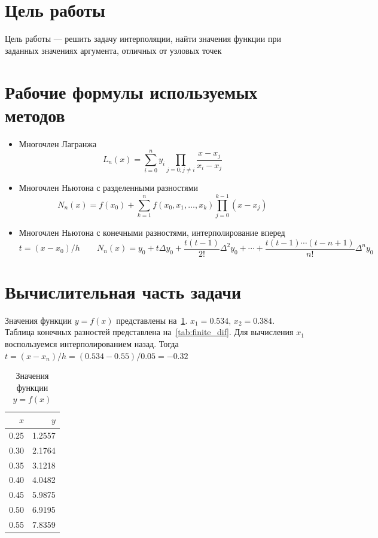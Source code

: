 \section{Цель работы}
Цель работы --- решить задачу интерполяции, найти значения функции при
заданных значениях аргумента, отличных от узловых точек
\section{Рабочие формулы используемых методов}
\begin{itemize}
  \item Многочлен Лагранжа
    \[ L_n(x) = \sum_{i = 0}^n y_i \prod_{j=0; j \neq i} \frac{x - x_j}{x_i - x_j} \]
  \item Многочлен Ньютона с разделенными разностями
    \[ 
    N_n(x) = f(x_0) + \sum_{k = 1}^n f(x_0, x_1, \ldots, x_k)
    \prod_{j=0}^{k-1} (x - x_j)
    \]
  \item Многочлен Ньютона с конечными разностями, интерполирование вперед
    \[
      t = (x - x_0) / h \qquad
    N_n(x) = y_0 + t \Delta y_0 + \frac{t(t-1)}{2!} \Delta^2 y_0
    + \cdots + \frac{t(t-1)\cdots(t-n+1)}{n!} \Delta^n y_0
    \]
\end{itemize}

\section{Вычислительная часть задачи}
Значения функции \(y = f(x)\) представлены на~\cref{tab:function}.
\(x_1 = 0.534\), \(x_2 = 0.384\).
Таблица конечных разностей представлена на~\cref{tab:finite_dif}.
Для вычисления \(x_1\) воспользуемся интерполированием назад.
Тогда \( t = (x - x_n) / h = (0.534 - 0.55) / 0.05 = -0.32 \)
\begin{table}
  \caption{Значения функции \(y = f(x)\)}\label{tab:function}
  \centering
  \begin{tabular}{rr}
    \toprule
    \(x\) & \(y\) \\
    \midrule
    0.25 & 1.2557 \\
    0.30 & 2.1764 \\
    0.35 & 3.1218 \\
    0.40 & 4.0482 \\
    0.45 & 5.9875 \\
    0.50 & 6.9195 \\
    0.55 & 7.8359 \\
    \bottomrule
  \end{tabular}
\end{table}

